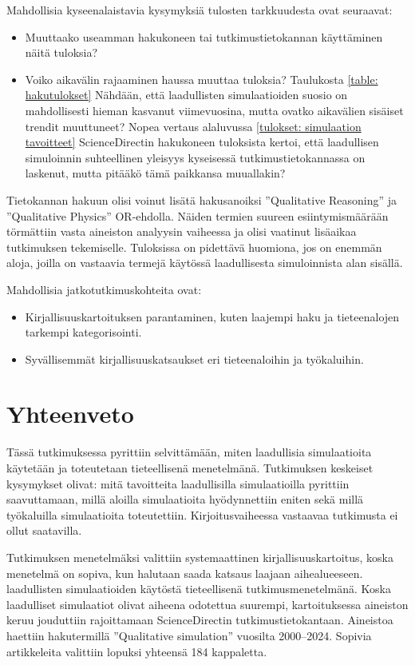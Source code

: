\documentclass[utf8]{gradu3}
\begin{document}
Mahdollisia kyseenalaistavia kysymyksiä tulosten tarkkuudesta ovat seuraavat:
\begin{itemize}
    \item Muuttaako useamman hakukoneen tai tutkimustietokannan käyttäminen näitä tuloksia? 
    \item Voiko aikavälin rajaaminen haussa muuttaa tuloksia? Taulukosta \ref{table: hakutulokset} Nähdään, että laadullisten simulaatioiden suosio on mahdollisesti hieman kasvanut viimevuosina, mutta ovatko aikavälien sisäiset trendit muuttuneet? 
    Nopea vertaus alaluvussa \ref{tulokset: simulaation tavoitteet} ScienceDirectin hakukoneen tuloksista kertoi, että laadullisen simuloinnin suhteellinen yleisyys kyseisessä tutkimustietokannassa on laskenut, mutta pitääkö tämä paikkansa muuallakin?
\end{itemize}

Tietokannan hakuun olisi voinut lisätä hakusanoiksi 
''Qualitative Reasoning'' ja ''Qualitative Physics'' OR-ehdolla. 
Näiden termien suureen esiintymismäärään törmättiin vasta aineiston 
analyysin vaiheessa ja olisi vaatinut lisäaikaa tutkimuksen tekemiselle.
Tuloksissa on pidettävä huomiona, jos on enemmän aloja, joilla on vastaavia
termejä käytössä laadullisesta simuloinnista alan sisällä.

Mahdollisia jatkotutkimuskohteita ovat: 
\begin{itemize}
    \item Kirjallisuuskartoituksen parantaminen, kuten laajempi haku ja tieteenalojen tarkempi kategorisointi.
    \item Syvällisemmät kirjallisuuskatsaukset eri tieteenaloihin ja työkaluihin.
\end{itemize}

\chapter{Yhteenveto}
Tässä tutkimuksessa pyrittiin selvittämään, miten laadullisia simulaatioita 
käytetään ja toteutetaan tieteellisenä menetelmänä. 
Tutkimuksen keskeiset kysymykset olivat: 
mitä tavoitteita laadullisilla simulaatioilla pyrittiin saavuttamaan, 
millä aloilla simulaatioita hyödynnettiin eniten 
sekä millä työkaluilla simulaatioita toteutettiin. 
Kirjoitusvaiheessa vastaavaa tutkimusta ei ollut saatavilla.

Tutkimuksen menetelmäksi valittiin systemaattinen kirjallisuuskartoitus, koska
menetelmä on sopiva, kun halutaan saada katsaus laajaan aihealueeseen.
laadullisten simulaatioiden käytöstä tieteellisenä tutkimusmenetelmänä.
Koska laadulliset simulaatiot olivat aiheena odotettua suurempi, 
kartoituksessa aineiston keruu jouduttiin rajoittamaan ScienceDirectin 
tutkimustietokantaan. Aineistoa haettiin hakutermillä ''Qualitative simulation''
vuosilta 2000–2024. Sopivia artikkeleita valittiin lopuksi yhteensä 184 kappaletta.
\end{document}

